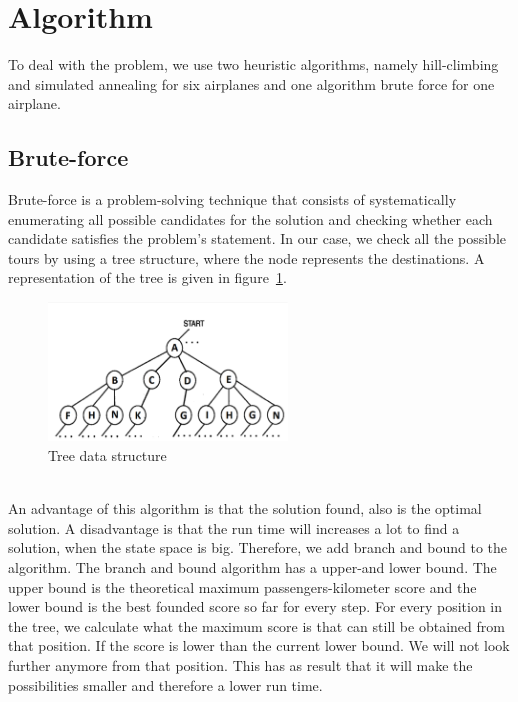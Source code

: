 \documentclass[journal]{IEEEtran}
\begin{document}
\section{Algorithm}
To deal with the problem, we use two heuristic algorithms, namely hill-climbing and simulated annealing for six airplanes and one algorithm brute force for one airplane.

\subsection{Brute-force}
Brute-force is a problem-solving technique that consists of systematically enumerating all possible candidates for the solution and checking whether each candidate satisfies the problem's statement. In our case, we check all the possible tours by using a tree structure, where the node represents the destinations. A representation of the tree is given in figure~\ref{fig:tree}.\\
\begin{figure}[!h]
\centering
\includegraphics[width=2.5in]{tree}
\caption{Tree data structure}
\label{fig:tree}
\end{figure}
\\
An advantage of this algorithm is that the solution found, also is  the optimal solution. A disadvantage is that the run time will increases a lot to find a solution, when the state space is big. Therefore, we add branch and bound to the algorithm. The branch and bound algorithm has a upper-and lower bound. The upper bound is the theoretical maximum passengers-kilometer score and the lower bound is the best founded score so far for every step. For every position in the tree, we calculate what the maximum score is that can still be obtained from that position. If the score is lower than the current lower bound. We will not look further anymore from that position. This has as result that it will make the possibilities smaller and therefore a lower run time. 
\end{document}
